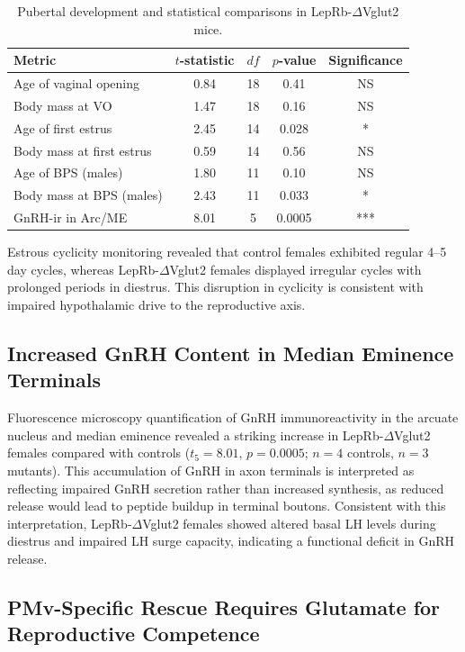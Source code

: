 \documentclass[12pt]{article}
\begin{document}
\begin{table}[htbp]
\centering
\caption{Pubertal development and statistical comparisons in LepRb-$\Delta$Vglut2 mice.}
\label{tab:puberty}
\begin{tabular}{lcccc}
\toprule
Metric & $t$-statistic & $df$ & $p$-value & Significance \\
\midrule
Age of vaginal opening & 0.84 & 18 & 0.41 & NS \\
Body mass at VO & 1.47 & 18 & 0.16 & NS \\
Age of first estrus & 2.45 & 14 & 0.028 & * \\
Body mass at first estrus & 0.59 & 14 & 0.56 & NS \\
Age of BPS (males) & 1.80 & 11 & 0.10 & NS \\
Body mass at BPS (males) & 2.43 & 11 & 0.033 & * \\
GnRH-ir in Arc/ME & 8.01 & 5 & 0.0005 & *** \\
\bottomrule
\end{tabular}
\end{table}

Estrous cyclicity monitoring revealed that control females exhibited regular 4--5 day cycles, whereas LepRb-$\Delta$Vglut2 females displayed irregular cycles with prolonged periods in diestrus. This disruption in cyclicity is consistent with impaired hypothalamic drive to the reproductive axis.

\subsection{Increased GnRH Content in Median Eminence Terminals}

Fluorescence microscopy quantification of GnRH immunoreactivity in the arcuate nucleus and median eminence revealed a striking increase in LepRb-$\Delta$Vglut2 females compared with controls ($t_5 = 8.01$, $p = 0.0005$; $n = 4$ controls, $n = 3$ mutants). This accumulation of GnRH in axon terminals is interpreted as reflecting impaired GnRH secretion rather than increased synthesis, as reduced release would lead to peptide buildup in terminal boutons. Consistent with this interpretation, LepRb-$\Delta$Vglut2 females showed altered basal LH levels during diestrus and impaired LH surge capacity, indicating a functional deficit in GnRH release.

\subsection{PMv-Specific Rescue Requires Glutamate for Reproductive Competence}
\end{document}
